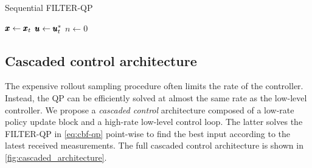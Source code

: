 \begin{algorithm}
\caption{Sequential FILTER-QP \label{algo:sequential_qp}}
$\pmb{x} \gets \pmb{x}_t$\;
$\pmb{u} \gets \pmb{u}^*_t$\;
$n \gets 0$\;
\end{algorithm}

\subsection{Cascaded control architecture}
The expensive rollout sampling procedure often limits the rate of the controller. Instead, the QP can be efficiently solved at almost the same rate as the low-level controller. We propose a \emph{cascaded control} architecture composed of a low-rate policy update block and a high-rate low-level control loop. The latter solves the FILTER-QP in \eqref{eq:cbf-qp} point-wise to find the best input according to the latest received measurements. The full cascaded control architecture is shown in \fig \ref{fig:cascaded_architecture}.

